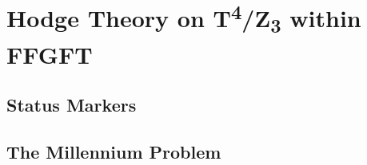 
\providecommand{\BM}{\textbf{[B]}}
\providecommand{\KM}{\textbf{[K]}}
\providecommand{\SM}{\textbf{[S]}}
\providecommand{\SetzM}{\textbf{[SETZUNG]}}
\providecommand{\QM}{\textbf{[Q]}}
\providecommand{\EM}{\textbf{[E]}}
\providecommand{\XM}{\textbf{[X]}}

\chapter*{Hodge Theory on T\textsuperscript{4}/Z\textsubscript{3} within FFGFT}

\begin{abstract}
The second Millennium Problem of mathematics — the Hodge Conjecture — asks
whether every Hodge class of a smooth projective variety is a rational
linear combination of algebraic cycle classes. For the base geometry of
FFGFT, the orbifold $T^4/\mathbb{Z}_3$, this question admits a positive
answer: the complex 2-torus $T^4$ is polarisable in the form
$E_\omega\times E_\omega$ and hence an abelian surface for which the
Hodge Conjecture is known to hold; the nine $\mathbb{Z}_3$ fixed points
furnish algebraic 0-cycles; and
the sector pairing $k \leftrightarrow -k$ (Doc.~343) is the Hodge symmetry
$H^{p,q} \leftrightarrow H^{q,p}$. The Galois Frobenius $x \mapsto x^3$ on
$GF(27)^*$, by contrast, is not identical to the algebraic Frobenius on
étale cohomology: the latter's eigenvalues on $H^1$ have absolute value
$\sqrt{3}$ and are not roots of unity. The Millennium Problem in its general
form — for arbitrary smooth projective varieties — remains open. What FFGFT
supplies is structural completeness for its own geometry.
\end{abstract}

\section*{Status Markers}


\section{The Millennium Problem}

